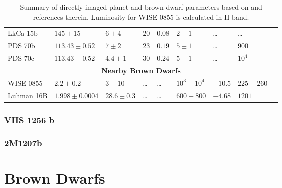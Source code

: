 \begin{landscape}
\begin{table}[t]
\begin{small}
\begin{tabular}{lllllllll}
		LkCa 15b  & $145\pm15$    & $6\pm4$     & $20$ & $0.08$ & $2\pm1$ & \ldots & \ldots &\\
		PDS 70b   & $113.43\pm0.52$ & $7\pm2$   & $23$ & $0.19$ & $5\pm1$ & \ldots & $900$ &\parencite{Haffert2019}\\
		PDS 70c   & $113.43\pm0.52$ & $4.4\pm1$ & $30$ & $0.24$ & $5\pm1$ & \ldots &  $10^{4}$ & \parencite{Haffert2019}\\
		\midrule
		\multicolumn{9}{c}{\textbf{Nearby Brown Dwarfs}}\\
		\midrule
		WISE 0855   & $2.2\pm0.2$ & $3-10$ & \ldots & \ldots & $10^{3}-10^{4}$ & $-10.5$ &  $225-260$ & \parencite{Luhman2014,Tinney2014}\\
		Luhman 16B   & $1.998\pm0.0004$ & $28.6\pm0.3$ & \ldots & \ldots & $600-800$ & $-4.68$&  $1201$ & \parencite{Sahlmann2015,Garcia2017}\\
		\bottomrule
	\end{tabular}
\end{small}
	\caption{Summary of directly imaged planet and brown dwarf parameters based on \parencite{Bowler2016} and references therein. Luminosity for WISE 0855 is calculated in H band.}
	\label{tab:exoplanetparams}
\end{table}
\end{landscape}
\parencite{Lagage2015} %
\subsubsection{VHS 1256 b}
\subsubsection{2M1207b}
\section{Brown Dwarfs}
\parencite{Oliveira} %
\parencite{Helling2014}%
\parencite{Cooper2014} %
\parencite{Madhusudhan2018a} %
\parencite{Burrows2003} %
\parencite{Marley2014} %
\parencite{Manjavacas2014} %
\parencite{Biller2017} %
\parencite{Faherty2018} %
\parencite{Morley2014} %

